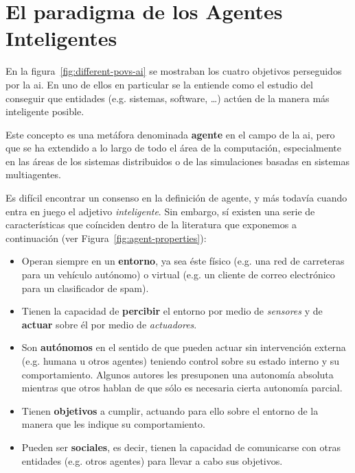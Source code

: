 \section{El paradigma de los Agentes Inteligentes}
\label{ch:ci:s:agent-concept}

En la figura~\ref{fig:different-povs-ai} se mostraban los cuatro objetivos perseguidos por la \gls{ai}. En uno de ellos en particular se la entiende como el estudio del conseguir que entidades (e.g. sistemas, software, \ldots) actúen de la manera más inteligente posible.

Este concepto es una metáfora denominada \textbf{agente} en el campo de la \ac{ai}, pero que se ha extendido a lo largo de todo el área de la computación, especialmente en las áreas de los sistemas distribuidos o de las simulaciones basadas en sistemas multiagentes.

Es difícil encontrar un consenso en la definición de agente, y más todavía cuando entra en juego el adjetivo \textit{inteligente}. Sin embargo, sí existen una serie de características que coínciden dentro de la literatura que exponemos a continuación (ver Figura~\ref{fig:agent-properties}):

\begin{itemize}
	\item Operan siempre en un \textbf{entorno}, ya sea éste físico (e.g. una red de carreteras para un vehículo autónomo) o virtual (e.g. un cliente de correo electrónico para un clasificador de spam).
	\item Tienen la capacidad de \textbf{percibir} el entorno por medio de \textit{sensores} y de \textbf{actuar} sobre él por medio de \textit{actuadores}.
	\item Son \textbf{autónomos} en el sentido de que pueden actuar sin intervención externa (e.g. humana u otros agentes) teniendo control sobre su estado interno y su comportamiento. Algunos autores les presuponen una autonomía absoluta mientras que otros hablan de que sólo es necesaria cierta autonomía parcial.
	\item Tienen \textbf{objetivos} a cumplir, actuando para ello sobre el entorno de la manera que les indique su comportamiento.
	\item Pueden ser \textbf{sociales}, es decir, tienen la capacidad de comunicarse con otras entidades (e.g. otros agentes) para llevar a cabo sus objetivos.
\end{itemize}

